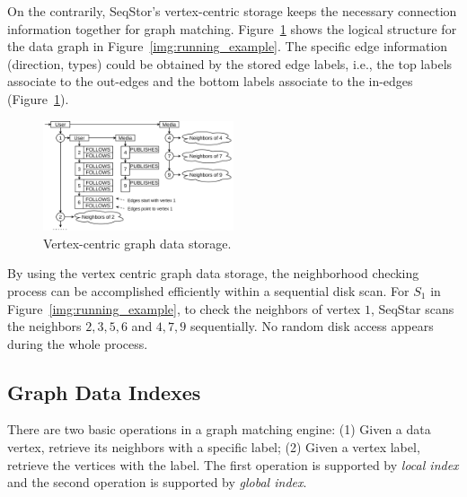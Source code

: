 On the contrarily, SeqStor's vertex-centric storage keeps the necessary connection information together for graph matching.
Figure~\ref{img:data_example} shows the logical structure for the data graph in Figure~\ref{img:running_example}.
The specific edge information (direction, types) could be obtained by the stored edge labels, i.e., the top labels associate to the out-edges and the bottom labels associate to the in-edges (Figure~\ref{img:data_example}).

\begin{figure}[ht]
  \centering
  \includegraphics[width=0.5\textwidth]{img/data_example.pdf}
  \caption{Vertex-centric graph data storage.}\label{img:data_example}
\end{figure}

By using the vertex centric graph data storage, the neighborhood checking process can be accomplished efficiently within a sequential disk scan.
For $S_1$ in Figure~\ref{img:running_example},
to check the neighbors of vertex $1$, SeqStar scans the neighbors $2, 3, 5, 6$ and $4, 7, 9$ sequentially.
No random disk access appears during the whole process.
\subsection{Graph Data Indexes}
There are two basic operations in a graph matching engine:
(1) Given a data vertex, retrieve its neighbors with a specific label;
(2) Given a vertex label, retrieve the vertices with the label. The first operation is supported by \emph{local index} and the second operation is supported by \emph{global index}.

